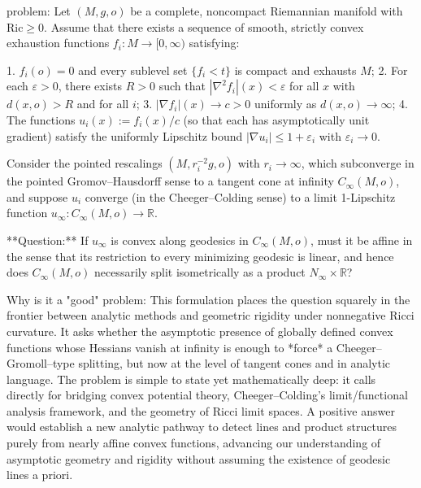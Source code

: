 problem:  
Let \((M,g,o)\) be a complete, noncompact Riemannian manifold with \(\mathrm{Ric}\ge0\).  
Assume that there exists a sequence of smooth, strictly convex exhaustion functions \(f_i:M\to[0,\infty)\) satisfying:  

1. \(f_i(o)=0\) and every sublevel set \(\{f_i<t\}\) is compact and exhausts \(M\);  
2. For each \(\varepsilon>0\), there exists \(R>0\) such that \(|\nabla^2 f_i|(x)<\varepsilon\) for all \(x\) with \(d(x,o)>R\) and for all \(i\);  
3. \(|\nabla f_i|(x)\to c>0\) uniformly as \(d(x,o)\to\infty\);  
4. The functions \(u_i(x):=f_i(x)/c\) (so that each has asymptotically unit gradient) satisfy the uniformly Lipschitz bound \(|\nabla u_i|\le 1+\varepsilon_i\) with \(\varepsilon_i\to0\).  

Consider the pointed rescalings \((M,r_i^{-2}g,o)\) with \(r_i\to\infty\), which subconverge in the pointed Gromov–Hausdorff sense to a tangent cone at infinity \(C_\infty(M,o)\), and suppose \(u_i\) converge (in the Cheeger–Colding sense) to a limit 1-Lipschitz function \(u_\infty\colon C_\infty(M,o)\to\mathbb{R}\).  

**Question:** If \(u_\infty\) is convex along geodesics in \(C_\infty(M,o)\), must it be affine in the sense that its restriction to every minimizing geodesic is linear, and hence does \(C_\infty(M,o)\) necessarily split isometrically as a product \(N_\infty\times\mathbb{R}\)?  

Why is it a "good" problem:  
This formulation places the question squarely in the frontier between analytic methods and geometric rigidity under nonnegative Ricci curvature. It asks whether the asymptotic presence of globally defined convex functions whose Hessians vanish at infinity is enough to *force* a Cheeger–Gromoll–type splitting, but now at the level of tangent cones and in analytic language. The problem is simple to state yet mathematically deep: it calls directly for bridging convex potential theory, Cheeger–Colding’s limit/functional analysis framework, and the geometry of Ricci limit spaces. A positive answer would establish a new analytic pathway to detect lines and product structures purely from nearly affine convex functions, advancing our understanding of asymptotic geometry and rigidity without assuming the existence of geodesic lines a priori.